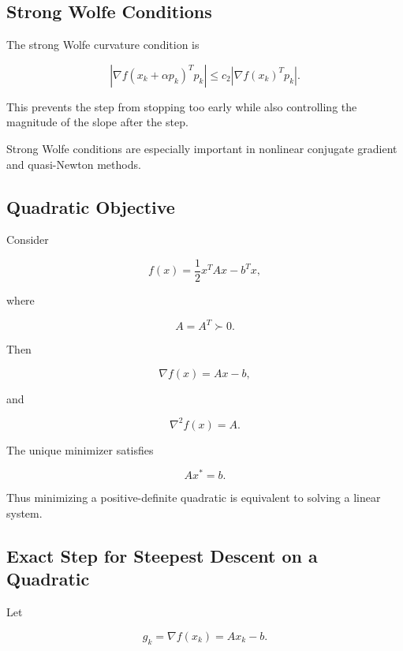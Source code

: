 \subsection{Strong Wolfe Conditions}
\label{subsec:strong-wolfe}

The strong Wolfe curvature condition is

\[
\boxed{
\left|
\nabla f(x_k+\alpha p_k)^Tp_k
\right|
\leq
c_2
\left|
\nabla f(x_k)^Tp_k
\right|.
}
\]

This prevents the step from stopping too early while also controlling the
magnitude of the slope after the step.

Strong Wolfe conditions are especially important in nonlinear conjugate
gradient and quasi-Newton methods.

\subsection{Quadratic Objective}
\label{subsec:quadratic-objective-numerical-optimization}

Consider

\[
\boxed{
f(x)
=
\frac12x^TAx-b^Tx,
}
\]

where

\[
A=A^T\succ0.
\]

Then

\[
\boxed{
\nabla f(x)
=
Ax-b,
}
\]

and

\[
\boxed{
\nabla^2f(x)
=
A.
}
\]

The unique minimizer satisfies

\[
\boxed{
Ax^*=b.
}
\]

Thus minimizing a positive-definite quadratic is equivalent to solving a
linear system.

\subsection{Exact Step for Steepest Descent on a Quadratic}
\label{subsec:quadratic-steepest-descent-step}

Let

\[
g_k
=
\nabla f(x_k)
=
Ax_k-b.
\]

